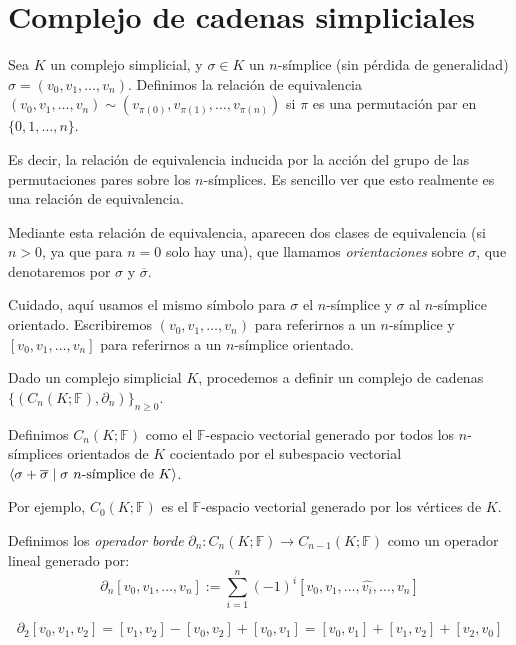 \documentclass[HS.tex]{subfiles}
\begin{document}
\section{Complejo de cadenas simpliciales}
\begin{defi}
Sea $K$ un  complejo simplicial, y $\sigma \in K$ un $n$-símplice (sin pérdida de generalidad) $\sigma = (v_0,v_1,\dots,v_n)$.
Definimos la relación de equivalencia $(v_0,v_1,\dots,v_n) \sim (v_{\pi(0)},v_{\pi(1)},\dots,v_{\pi(n)})$ si $\pi$ es una permutación par en $\{0,1,\dots,n\}$.
\end{defi}
Es decir, la relación de equivalencia inducida por la acción del grupo de las permutaciones pares sobre los $n$-símplices.
Es sencillo ver que esto realmente es una relación de equivalencia.

Mediante esta relación de equivalencia, aparecen dos clases de equivalencia (si $n > 0$, ya que para $n=0$ solo hay una), que llamamos \emph{orientaciones} sobre $\sigma$, que denotaremos por $\sigma$ y $\overline{\sigma}$.

Cuidado, aquí usamos el mismo símbolo para $\sigma$ el $n$-símplice y $\sigma$ al $n$-símplice orientado.
Escribiremos $(v_0,v_1,\dots,v_n)$ para referirnos a un $n$-símplice y $[v_0,v_1,\dots,v_n]$ para referirnos a un $n$-símplice orientado.

Dado un complejo simplicial $K$, procedemos a definir un complejo de cadenas $\{(C_n(K;\mathbb{F}), \partial_n)\}_{n\geq 0}$. 
\begin{defi}
Definimos $C_n(K;\mathbb{F})$ como el $\mathbb{F}$-espacio vectorial generado por todos los $n$-símplices orientados de $K$ cocientado por el subespacio vectorial $\gene{\sigma + \overline{\sigma} \mid \sigma\ n\text{-símplice de }K}$.
\end{defi}
Por ejemplo, $C_0(K;\mathbb{F})$ es el $\mathbb{F}$-espacio vectorial generado por los vértices de $K$.

\begin{defi}
Definimos los \emph{operador borde} $\partial_n \colon C_n(K; \mathbb{F}) \to C_{n-1}(K; \mathbb{F})$ como un operador lineal generado por:
\[ \partial_n[v_0,v_1,\dots,v_n] := \sum_{i=1}^n (-1)^i [v_0,v_1,\dots,\widehat{v_i},\dots,v_n]\]
\end{defi}

\begin{ej}
\[ \partial_2[v_0,v_1,v_2] = [v_1,v_2] - [v_0,v_2] + [v_0,v_1] = [v_0,v_1] + [v_1,v_2] + [v_2,v_0] \]
\end{ej}
\end{document}

